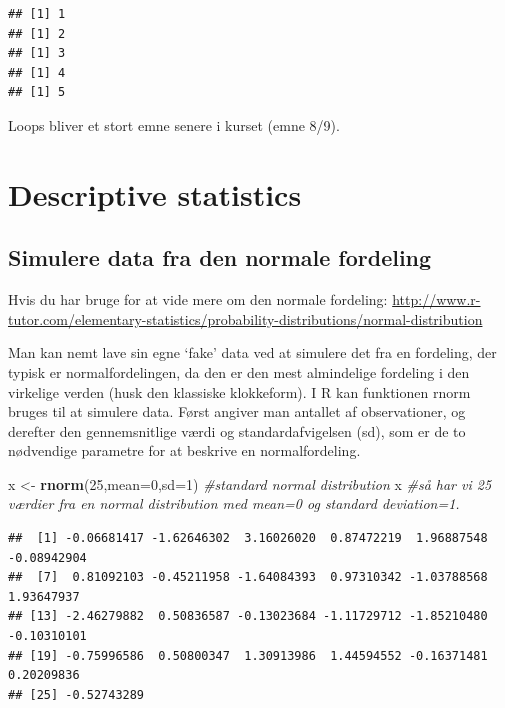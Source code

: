 \documentclass[
]{book}
\newenvironment{Shaded}{\begin{snugshade}}{\end{snugshade}}
\newcommand{\AttributeTok}[1]{\textcolor[rgb]{0.13,0.29,0.53}{#1}}
\newcommand{\CommentTok}[1]{\textcolor[rgb]{0.56,0.35,0.01}{\textit{#1}}}
\newcommand{\DecValTok}[1]{\textcolor[rgb]{0.00,0.00,0.81}{#1}}
\newcommand{\FunctionTok}[1]{\textcolor[rgb]{0.13,0.29,0.53}{\textbf{#1}}}
\newcommand{\NormalTok}[1]{#1}
\newcommand{\OtherTok}[1]{\textcolor[rgb]{0.56,0.35,0.01}{#1}}
\begin{document}
\begin{verbatim}
## [1] 1
## [1] 2
## [1] 3
## [1] 4
## [1] 5
\end{verbatim}

Loops bliver et stort emne senere i kurset (emne 8/9).

\section{Descriptive statistics}\label{descriptive-statistics}

\subsection{Simulere data fra den normale fordeling}\label{simulere-data-fra-den-normale-fordeling}

Hvis du har bruge for at vide mere om den normale fordeling: \url{http://www.r-tutor.com/elementary-statistics/probability-distributions/normal-distribution}

Man kan nemt lave sin egne `fake' data ved at simulere det fra en fordeling, der typisk er normalfordelingen, da den er den mest almindelige fordeling i den virkelige verden (husk den klassiske klokkeform). I R kan funktionen rnorm bruges til at simulere data. Først angiver man antallet af observationer, og derefter den gennemsnitlige værdi og standardafvigelsen (sd), som er de to nødvendige parametre for at beskrive en normalfordeling.

\begin{Shaded}
\begin{Highlighting}[]
\NormalTok{x }\OtherTok{\textless{}{-}} \FunctionTok{rnorm}\NormalTok{(}\DecValTok{25}\NormalTok{,}\AttributeTok{mean=}\DecValTok{0}\NormalTok{,}\AttributeTok{sd=}\DecValTok{1}\NormalTok{) }\CommentTok{\#standard normal distribution}
\NormalTok{x }\CommentTok{\#så har vi 25 værdier fra en normal distribution med mean=0 og standard deviation=1.}
\end{Highlighting}
\end{Shaded}

\begin{verbatim}
##  [1] -0.06681417 -1.62646302  3.16026020  0.87472219  1.96887548 -0.08942904
##  [7]  0.81092103 -0.45211958 -1.64084393  0.97310342 -1.03788568  1.93647937
## [13] -2.46279882  0.50836587 -0.13023684 -1.11729712 -1.85210480 -0.10310101
## [19] -0.75996586  0.50800347  1.30913986  1.44594552 -0.16371481  0.20209836
## [25] -0.52743289
\end{verbatim}
\end{document}
